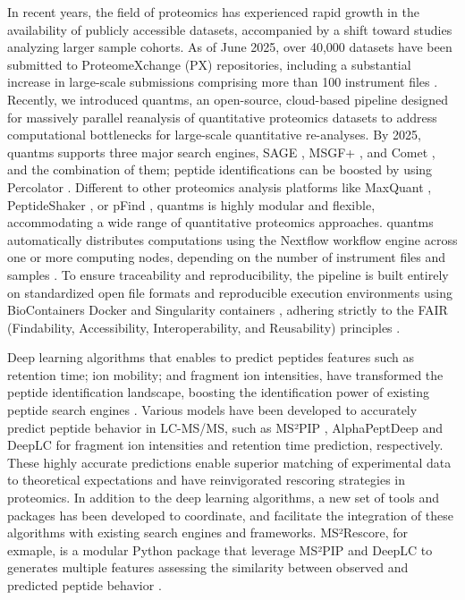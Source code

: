 \documentclass[12pt]{article}
\begin{document}
In recent years, the field of proteomics has experienced rapid growth in the availability of publicly accessible datasets, accompanied by a shift toward studies analyzing larger sample cohorts. As of June 2025, over 40,000 datasets have been submitted to ProteomeXchange (PX) repositories, including a substantial increase in large-scale submissions comprising more than 100 instrument files \cite{perez-riverol_pride_2025}. Recently, we introduced quantms, an open-source, cloud-based pipeline designed for massively parallel reanalysis of quantitative proteomics datasets \cite{dai_quantms_2024} to address computational bottlenecks for large-scale quantitative re-analyses. By 2025, quantms supports three major search engines, SAGE \cite{lazear2023sage}, MSGF+ \cite{Kim2014-sr}, and Comet \cite{Eng2013-ds}, and the combination of them; peptide identifications can be boosted by using Percolator \cite{kall2007semi}. Different to other proteomics analysis platforms like MaxQuant \cite{cox_maxquant_2008}, PeptideShaker \cite{vaudel2015peptideshaker}, or pFind \cite{wang_pfind_2007}, quantms is highly modular and flexible, accommodating a wide range of quantitative proteomics approaches. quantms automatically distributes computations using the Nextflow workflow engine across one or more computing nodes, depending on the number of instrument files and samples \cite{di_tommaso_nextflow_2017}. To ensure traceability and reproducibility, the pipeline is built entirely on standardized open file formats \cite{dai_proteomics_2021, martens_mzmlcommunity_2011, griss2014mztab} and reproducible execution environments using BioContainers Docker and Singularity containers \cite{da2017biocontainers}, adhering strictly to the FAIR (Findability, Accessibility, Interoperability, and Reusability) principles \cite{wilkinson_fair_2016}. 

Deep learning algorithms that enables to predict peptides features such as retention time; ion mobility; and fragment ion intensities, have transformed the peptide identification landscape, boosting the identification power of existing peptide search engines \cite{buur_ms2_2024, yang2023msbooster}. Various models have been developed to accurately predict peptide behavior in LC-MS/MS, such as MS²PIP \cite{declercq_updated_2023}, AlphaPeptDeep \cite{zeng_alphapeptdeep_2022} and DeepLC \cite{bouwmeester_deeplc_2021} for fragment ion intensities and retention time prediction, respectively. These highly accurate predictions enable superior matching of experimental data to theoretical expectations and have reinvigorated rescoring strategies in proteomics. In addition to the deep learning algorithms, a new set of tools and packages has been developed to coordinate, and facilitate the integration of these algorithms with existing search engines and frameworks. MS²Rescore, for exmaple, is a modular Python package that leverage MS²PIP and DeepLC to generates multiple features assessing the similarity between observed and predicted peptide behavior \cite{declercq_tims2_2025}.
\end{document}
